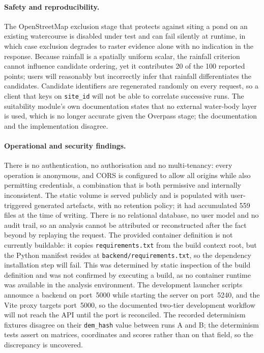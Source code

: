 \documentclass[sigconf,review,10pt]{acmart}
\newcommand{\cb}{\allowbreak}
\newcommand{\codelong}[1]{\texttt{#1}}
\begin{document}
\paragraph{Safety and reproducibility.}
The OpenStreetMap exclusion stage that protects against siting a pond on an
existing watercourse is disabled under test and can fail silently at
runtime, in which case exclusion degrades to raster evidence alone with no
indication in the response. Because rainfall is a spatially uniform
scalar, the rainfall criterion cannot influence candidate ordering, yet it
contributes 20 of the 100 reported points; users will reasonably but
incorrectly infer that rainfall differentiates the candidates. Candidate
identifiers are regenerated randomly on every request, so a client that
keys on \texttt{site\_id} will not be able to correlate successive runs.
The suitability module's own documentation states that no external
water-body layer is used, which is no longer accurate given the Overpass
stage; the documentation and the implementation disagree.

\paragraph{Operational and security findings.}
There is no authentication, no authorisation and no multi-tenancy: every
operation is anonymous, and CORS is configured to allow all origins while
also permitting credentials, a combination that is both permissive and
internally inconsistent. The static volume is served publicly and is
populated with user-triggered generated artefacts, with no retention
policy; it had accumulated 559 files at the time of writing. There is no
relational database, no user model and no audit trail, so an analysis
cannot be attributed or reconstructed after the fact beyond by replaying
the request. The provided container definition is not currently buildable:
it copies \texttt{requirements.txt} from the build context root, but the
Python manifest resides at \codelong{backend/\cb{}requirements.\cb{}txt}, so the
dependency installation step will fail. This was determined by static
inspection of the build definition and was not confirmed by executing a
build, as no container runtime was available in the analysis environment.
The development launcher scripts announce a backend on port~5000 while
starting the server on port~5240, and the Vite proxy targets port~5000, so
the documented two-tier development workflow will not reach the API until
the port is reconciled. The recorded determinism fixtures disagree on
their \texttt{dem\_hash} value between runs A and B; the determinism tests
assert on matrices, coordinates and scores rather than on that field, so
the discrepancy is uncovered.
\end{document}
